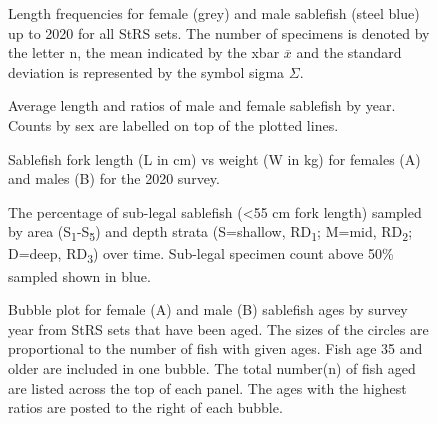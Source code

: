 \documentclass[12pt]{article}\usepackage[]{graphicx}\usepackage[]{color}
\begin{document}
\begin{figure}[htb]

{\centering {} 

}

\caption{Length frequencies for female (grey) and male sablefish (steel blue) up to 2020 for all StRS sets. The number of specimens is denoted by the letter n, the mean indicated by the xbar \(\overline{x}\) and the standard deviation is represented by the symbol sigma \(\Sigma\).}\label{fig:figure10}
\end{figure}

\begin{figure}[htb]

{\centering {} 

}

\caption{Average length and ratios of male and female sablefish by year. Counts by sex are labelled on top of the plotted lines.}\label{fig:figure11}
\end{figure}

\begin{figure}[htb]

{\centering {} 

}

\caption{Sablefish fork length (L in cm) vs weight (W in kg) for females (A) and males (B) for the 2020 survey.}\label{fig:figure12}
\end{figure}

\begin{figure}[htb]

{\centering {} 

}

\caption{The percentage of sub-legal sablefish (\textless55 cm fork length) sampled by area (S\textsubscript{1}-S\textsubscript{5}) and depth strata (S=shallow, RD\textsubscript{1}; M=mid, RD\textsubscript{2}; D=deep, RD\textsubscript{3}) over time. Sub-legal specimen count above 50\% sampled shown in blue.}\label{fig:figure13}
\end{figure}
\clearpage


\begin{figure}[htb]

{\centering {} 

}

\caption{Bubble plot for female (A) and male (B) sablefish ages by survey year from StRS sets that have been aged. The sizes of the circles are proportional to the number of fish with given ages. Fish age 35 and older are included in one bubble. The total number(n) of fish aged are listed across the top of each panel. The ages with the highest ratios are posted to the right of each bubble.}\label{fig:figure14}
\end{figure}
\clearpage
\end{document}
